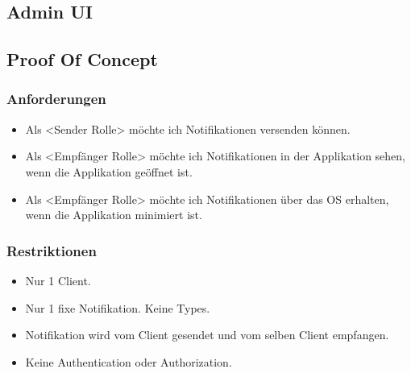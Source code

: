 \subsection{Admin UI}

\subsection{Proof Of Concept}
\subsubsection*{Anforderungen}

\begin{itemize}
    \item Als <Sender Rolle> möchte ich Notifikationen versenden können. 
    \item Als <Empfänger Rolle> möchte ich Notifikationen in der Applikation sehen, wenn die Applikation geöffnet ist.  
    \item Als <Empfänger Rolle> möchte ich Notifikationen über das OS erhalten, wenn die Applikation minimiert ist. 
\end{itemize}

\subsubsection*{Restriktionen}

\begin{itemize}
    \item Nur 1 Client. 
    \item Nur 1 fixe Notifikation. Keine Types. 
    \item Notifikation wird vom Client gesendet und vom selben Client empfangen. 
    \item Keine Authentication oder Authorization. 
  
\end{itemize}


